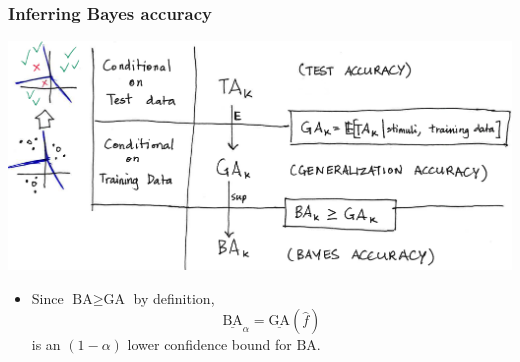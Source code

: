 \documentclass{beamer}
\begin{document}
\begin{frame}
\frametitle{Inferring Bayes accuracy}
\begin{center}
\includegraphics[scale = 0.3]{ta_to_ba.png}
\end{center}
\begin{itemize}
\item Since $\text{BA} \geq \text{GA}$ by definition,
\[
\underline{\text{BA}}_\alpha = \underline{\text{GA}}(\hat{f})
\]
is an $(1-\alpha)$ lower confidence bound for $\text{BA}$.
\end{itemize}
\end{frame}
\end{document}
